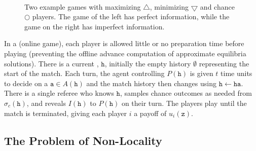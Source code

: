 \documentclass{aamas2015}
\newcommand{\tta}{\mathtt{a}}
\newcommand{\tth}{\mathtt{h}}
\newcommand{\ttz}{\mathtt{z}}
\newcommand{\defword}[1]{\textbf{\boldmath{#1}}}
\begin{document}
\begin{figure}
\begin{center}
~~~
\end{center}
\caption{Two example games with maximizing $\bigtriangleup$, minimizing $\bigtriangledown$ and chance $\bigcirc$ players. The game of the left has perfect information, while the game on the right has imperfect information. \label{fig:coordGame}}
\end{figure}

In a \defword{match} (online game), each player is allowed little or no preparation time before playing (preventing the offline advance computation of approximate equilibria solutions).
There is a current \defword{match history}, $\tth$, initially the empty history $\emptyset$ representing the start of the match. Each turn, 
the agent controlling $P(\tth)$ is given $t$ time units to decide on a \defword{match action} $\tta \in A(\tth)$ and the 
match history then changes using $\tth \leftarrow \tth \tta$. There is a single referee who knows $\tth$, samples chance outcomes 
as needed from $\sigma_c(\tth)$, and reveals $I(\tth)$ to $P(\tth)$ on their turn. The players play until the match is terminated, 
giving each player $i$ a payoff of $u_i(\ttz)$.

\subsection{The Problem of Non-Locality}
\end{document}
